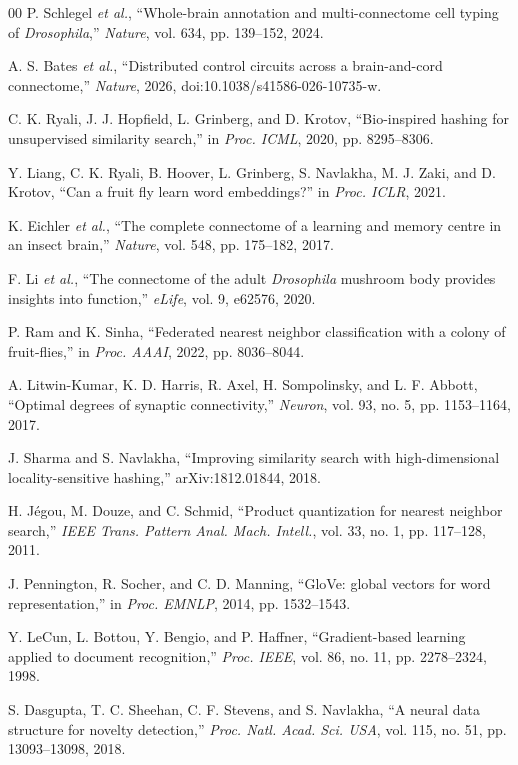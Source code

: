 \documentclass[conference]{IEEEtran}
\begin{document}
\begin{thebibliography}{00}
 P. Schlegel \textit{et al.}, ``Whole-brain annotation and
multi-connectome cell typing of \emph{Drosophila},'' \emph{Nature}, vol. 634,
pp. 139--152, 2024.

 A. S. Bates \textit{et al.}, ``Distributed control circuits
across a brain-and-cord connectome,'' \emph{Nature}, 2026,
doi:10.1038/s41586-026-10735-w.

 C. K. Ryali, J. J. Hopfield, L. Grinberg, and D. Krotov,
``Bio-inspired hashing for unsupervised similarity search,'' in \emph{Proc.
ICML}, 2020, pp. 8295--8306.

 Y. Liang, C. K. Ryali, B. Hoover, L. Grinberg, S. Navlakha,
M. J. Zaki, and D. Krotov, ``Can a fruit fly learn word embeddings?'' in
\emph{Proc. ICLR}, 2021.

 K. Eichler \textit{et al.}, ``The complete connectome of
a learning and memory centre in an insect brain,'' \emph{Nature}, vol. 548,
pp. 175--182, 2017.

 F. Li \textit{et al.}, ``The connectome of the adult
\emph{Drosophila} mushroom body provides insights into function,''
\emph{eLife}, vol. 9, e62576, 2020.

 P. Ram and K. Sinha, ``Federated nearest neighbor classification with a colony of fruit-flies,'' in \emph{Proc. AAAI}, 2022, pp. 8036--8044.

 A. Litwin-Kumar, K. D. Harris, R. Axel, H. Sompolinsky, and L. F. Abbott, ``Optimal degrees of synaptic connectivity,'' \emph{Neuron}, vol. 93, no. 5, pp. 1153--1164, 2017.

 J. Sharma and S. Navlakha, ``Improving similarity search
with high-dimensional locality-sensitive hashing,'' arXiv:1812.01844, 2018.

 H. J\'egou, M. Douze, and C. Schmid, ``Product quantization
for nearest neighbor search,'' \emph{IEEE Trans. Pattern Anal. Mach. Intell.},
vol. 33, no. 1, pp. 117--128, 2011.

 J. Pennington, R. Socher, and C. D. Manning, ``GloVe:
global vectors for word representation,'' in \emph{Proc. EMNLP}, 2014, pp.
1532--1543.

 Y. LeCun, L. Bottou, Y. Bengio, and P. Haffner,
``Gradient-based learning applied to document recognition,'' \emph{Proc.
IEEE}, vol. 86, no. 11, pp. 2278--2324, 1998.

 S. Dasgupta, T. C. Sheehan, C. F. Stevens, and S.
Navlakha, ``A neural data structure for novelty detection,'' \emph{Proc. Natl.
Acad. Sci. USA}, vol. 115, no. 51, pp. 13093--13098, 2018.

\end{thebibliography}
\end{document}
